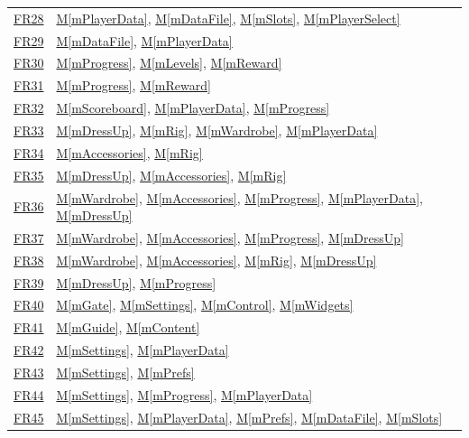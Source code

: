\documentclass[10pt, titlepage]{article}
\newcommand{\srsurl}{https://team-hindsight.github.io/ophthamology-game/SRS/SRS.pdf}
\newcommand{\srsitemref}[2]{\href{\srsurl\#nameddest=#1}{#2}}
\newcommand{\mref}[1]{\texorpdfstring{\hyperref[md:#1]{M\ref*{#1}}}{M\ref*{#1}}}
\begin{document}
\begin{longtable}{@{}p{}p{}@{}}
\srsitemref{FR_RestoreState}{FR28} & \mref{mPlayerData}, \mref{mDataFile}, \mref{mSlots}, \mref{mPlayerSelect} \\
\srsitemref{FR_CorruptData}{FR29} & \mref{mDataFile}, \mref{mPlayerData} \\
\srsitemref{FR_FirstReward}{FR30} & \mref{mProgress}, \mref{mLevels}, \mref{mReward} \\
\srsitemref{FR_NoDuplicateReward}{FR31} & \mref{mProgress}, \mref{mReward} \\
\srsitemref{FR_Scoreboard}{FR32} & \mref{mScoreboard}, \mref{mPlayerData}, \mref{mProgress} \\
\srsitemref{FR_ChooseCharacter}{FR33} & \mref{mDressUp}, \mref{mRig}, \mref{mWardrobe}, \mref{mPlayerData} \\
\srsitemref{FR_DiverseCharacters}{FR34} & \mref{mAccessories}, \mref{mRig} \\
\srsitemref{FR_Shop}{FR35} & \mref{mDressUp}, \mref{mAccessories}, \mref{mRig} \\
\srsitemref{FR_Purchase}{FR36} & \mref{mWardrobe}, \mref{mAccessories}, \mref{mProgress}, \mref{mPlayerData}, \mref{mDressUp} \\
\srsitemref{FR_PurchaseRefused}{FR37} & \mref{mWardrobe}, \mref{mAccessories}, \mref{mProgress}, \mref{mDressUp} \\
\srsitemref{FR_Equip}{FR38} & \mref{mWardrobe}, \mref{mAccessories}, \mref{mRig}, \mref{mDressUp} \\
\srsitemref{FR_NoRealMoney}{FR39} & \mref{mDressUp}, \mref{mProgress} \\
\srsitemref{FR_ParentGate}{FR40} & \mref{mGate}, \mref{mSettings}, \mref{mControl}, \mref{mWidgets} \\
\srsitemref{FR_ProcedureGuide}{FR41} & \mref{mGuide}, \mref{mContent} \\
\srsitemref{FR_Nickname}{FR42} & \mref{mSettings}, \mref{mPlayerData} \\
\srsitemref{FR_Preferences}{FR43} & \mref{mSettings}, \mref{mPrefs} \\
\srsitemref{FR_ResetJourney}{FR44} & \mref{mSettings}, \mref{mProgress}, \mref{mPlayerData} \\
\srsitemref{FR_ClearAllData}{FR45} & \mref{mSettings}, \mref{mPlayerData}, \mref{mPrefs}, \mref{mDataFile}, \mref{mSlots} \\

\end{longtable}
\end{document}
